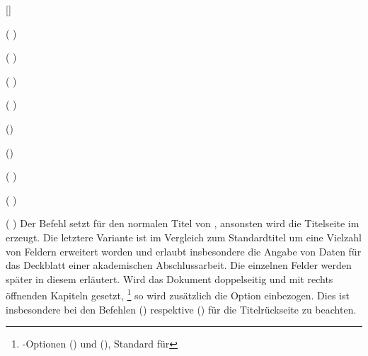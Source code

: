 \begin{Declaration*}{}
\begin{Declaration*}{}
\begin{Declaration*}{}
\begin{Declaration}{[]}
\begin{Declaration}[v2.02]{%
}
\begin{Declaration}[v2.06]{}(%
)
\begin{Declaration}[v2.02]{}(%
)
\begin{Declaration}[v2.03]{}(%
)
\begin{Declaration}[v2.03]{}(%
)
\begin{Declaration}[v2.03]{%
}()
\begin{Declaration}[v2.03]{%
}()
\begin{Declaration}[v2.03]{}(%
)
\begin{Declaration}[v2.03]{}(%
)
\begin{Declaration}[v2.03]{}(%
)
\printdeclarationlist%
%
%
%
Der Befehl  setzt für  den normalen 
Titel von \KOMAScript, ansonsten wird die Titelseite im \TUDCD erzeugt. Die 
letztere Variante ist im Vergleich zum Standardtitel um eine Vielzahl von 
Feldern erweitert worden und erlaubt insbesondere die Angabe von Daten für das 
Deckblatt einer akademischen Abschlussarbeit. Die einzelnen Felder werden 
später in diesem \autorefname erläutert. Wird das Dokument doppelseitig und mit 
rechts öffnenden Kapiteln gesetzt,%
\footnote{%
  \KOMAScript-Optionen () und 
  (), Standard für %
}
so wird zusätzlich die Option  einbezogen. Dies 
ist insbesondere bei den Befehlen () 
respektive () für die Titelrückseite 
zu beachten.


\end{Declaration}
\end{Declaration}
\end{Declaration}
\end{Declaration}
\end{Declaration}
\end{Declaration}
\end{Declaration}
\end{Declaration}
\end{Declaration}
\end{Declaration}
\end{Declaration}
\end{Declaration*}
\end{Declaration*}
\end{Declaration*}
